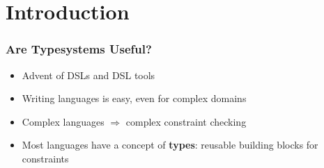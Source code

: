 \def \typIntro {Typesystem Introduction}
\section{Introduction}

\begin{frame}
  \frametitle{Are Typesystems Useful?}
  
  \begin{itemize}
    \item Advent of DSLs and DSL tools
    \item Writing languages is easy, even for complex domains
    \item Complex languages $\Rightarrow$ complex constraint checking
    \item Most languages have a concept of \textbf{types}: reusable building
    blocks for constraints
  \end{itemize}
\end{frame}

\begin{frame}
   \tableofcontents
{}
\end{frame}

